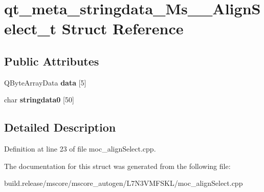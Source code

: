 \hypertarget{structqt__meta__stringdata___ms_____align_select__t}{}\section{qt\+\_\+meta\+\_\+stringdata\+\_\+\+Ms\+\_\+\+\_\+\+Align\+Select\+\_\+t Struct Reference}
\label{structqt__meta__stringdata___ms_____align_select__t}
\subsection*{Public Attributes}
\begin{DoxyCompactItemize}
\item 
\mbox{\label{structqt__meta__stringdata___ms_____align_select__t_a35b6a2ae18ce384b9f7e5214732091ac}} 
Q\+Byte\+Array\+Data {\bfseries data} \mbox{[}5\mbox{]}
\item 
\mbox{\label{structqt__meta__stringdata___ms_____align_select__t_acb5cab00069c32b34a6bfa79b88bb251}} 
char {\bfseries stringdata0} \mbox{[}50\mbox{]}
\end{DoxyCompactItemize}


\subsection{Detailed Description}


Definition at line 23 of file moc\+\_\+align\+Select.\+cpp.



The documentation for this struct was generated from the following file\+:\begin{DoxyCompactItemize}
\item 
build.\+release/mscore/mscore\+\_\+autogen/\+L7\+N3\+V\+M\+F\+S\+K\+L/moc\+\_\+align\+Select.\+cpp\end{DoxyCompactItemize}
